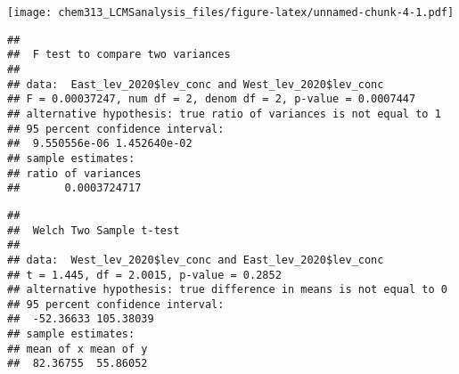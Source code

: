 \documentclass[]{article}
\newenvironment{Shaded}{\begin{snugshade}}{\end{snugshade}}
\newcommand{\KeywordTok}[1]{\textcolor[rgb]{0.13,0.29,0.53}{\textbf{#1}}}
\newcommand{\DataTypeTok}[1]{\textcolor[rgb]{0.13,0.29,0.53}{#1}}
\newcommand{\DecValTok}[1]{\textcolor[rgb]{0.00,0.00,0.81}{#1}}
\newcommand{\CommentTok}[1]{\textcolor[rgb]{0.56,0.35,0.01}{\textit{#1}}}
\newcommand{\OtherTok}[1]{\textcolor[rgb]{0.56,0.35,0.01}{#1}}
\newcommand{\OperatorTok}[1]{\textcolor[rgb]{0.81,0.36,0.00}{\textbf{#1}}}
\newcommand{\NormalTok}[1]{#1}
\begin{document}
\texttt{[image: chem313\_LCMSanalysis\_files/figure-latex/unnamed-chunk-4-1.pdf]}

\begin{Shaded}
\end{Shaded}

\begin{verbatim}
## 
##  F test to compare two variances
## 
## data:  East_lev_2020$lev_conc and West_lev_2020$lev_conc
## F = 0.00037247, num df = 2, denom df = 2, p-value = 0.0007447
## alternative hypothesis: true ratio of variances is not equal to 1
## 95 percent confidence interval:
##  9.550556e-06 1.452640e-02
## sample estimates:
## ratio of variances 
##       0.0003724717
\end{verbatim}

\begin{Shaded}
\end{Shaded}

\begin{verbatim}
## 
##  Welch Two Sample t-test
## 
## data:  West_lev_2020$lev_conc and East_lev_2020$lev_conc
## t = 1.445, df = 2.0015, p-value = 0.2852
## alternative hypothesis: true difference in means is not equal to 0
## 95 percent confidence interval:
##  -52.36633 105.38039
## sample estimates:
## mean of x mean of y 
##  82.36755  55.86052
\end{verbatim}

\begin{Shaded}
\end{Shaded}
\end{document}
